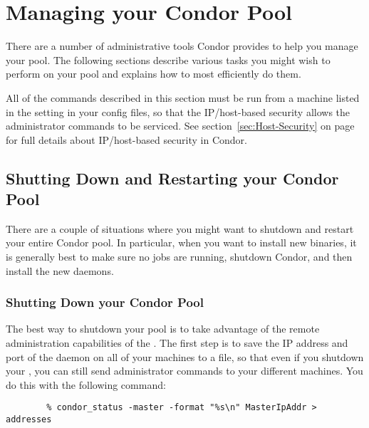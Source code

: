 \section{\label{sec:Pool-Management}Managing your Condor Pool}

There are a number of administrative tools Condor provides to help you
manage your pool.
The following sections describe various tasks you might wish to
perform on your pool and explains how to most efficiently do them. 

All of the commands described in this section must be run from a
machine listed in the  setting in
your config files, so that the IP/host-based security allows the
administrator commands to be serviced.
See section~\ref{sec:Host-Security} on
page~\pageref{sec:Host-Security} for full details about IP/host-based
security in Condor.

\subsection{\label{sec:Pool-Shutdown-and-Restart}
Shutting Down and Restarting your Condor Pool}

There are a couple of situations where you might want to shutdown and
restart your entire Condor pool.
In particular, when you want to install new binaries, it is generally
best to make sure no jobs are running, shutdown Condor, and then
install the new daemons.

\subsubsection{\label{sec:Pool-Shutdown}Shutting Down your Condor Pool}

The best way to shutdown your pool is to take advantage of the remote
administration capabilities of the .
The first step is to save the IP address and port of the
 daemon on all of your machines to a file, so that 
even if you shutdown your , you can still send
administrator commands to your different machines.
You do this with the following command:
\begin{verbatim}
        % condor_status -master -format "%s\n" MasterIpAddr > addresses
\end{verbatim}

